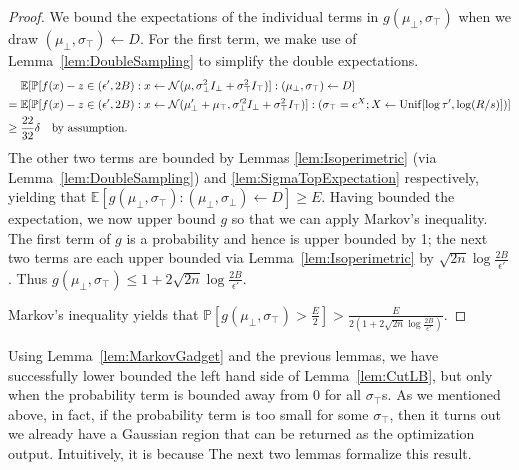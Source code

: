 \documentclass[11pt,letter]{article}
\renewcommand{\Pr}{\mathbb{P}}
\newcommand{\Exp}{\mathbb{E}}
\newcommand{\from}{\leftarrow}
\newcommand{\Normal}{\mathcal{N}}
\newcommand{\Unif}{\mathrm{Unif}}
\newcommand{\perr}{\delta}
\newcommand{\safety}{s}
\numberwithin{nTheorems}{section}
\begin{document}
\begin{proof}
We bound the expectations of the individual terms in $g(\mu_\bot,\sigma_\top)$ when we draw $(\mu_\bot,\sigma_\top)\from D$.
For the first term, we make use of Lemma~\ref{lem:DoubleSampling} to simplify the double expectations.
\begin{align*}
&\Exp[\Pr[f(x)-z \in (\epsilon',2B) : x \from \Normal(\mu, \sigma_\bot^2 I_\bot+\sigma_\top^2 I_\top)] : (\mu_\bot, \sigma_\top) \from D]\\
=\;&\Exp[\Pr[f(x)-z \in (\epsilon',2B) : x \from \Normal(\mu_\bot' + \mu_\top, \sigma_\bot'^2 I_\bot + \sigma_\top^2 I_\top)] : (\sigma_\top = e^X; X \from \Unif[\log \tau', \log (R/\safety)])]\\
\ge\;& \frac{22}{32}\perr \text{\quad by assumption.}
\end{align*}
The other two terms are bounded by Lemmas \ref{lem:Isoperimetric} (via Lemma~\ref{lem:DoubleSampling}) and \ref{lem:SigmaTopExpectation} respectively, yielding that $\Exp[g(\mu_\bot, \sigma_\top):(\mu_\bot, \sigma_\bot) \from D]\ge E$. Having bounded the expectation, we now upper bound $g$ so that we can apply Markov's inequality. The first term of $g$ is a probability and hence is upper bounded by 1; the next two terms are each upper bounded via Lemma~\ref{lem:Isoperimetric} by $\sqrt{2n}\log\frac{2B}{\epsilon'}$. Thus $g(\mu_\bot, \sigma_\top)\leq 1+2\sqrt{2n}\log\frac{2B}{\epsilon'}$.

Markov's inequality yields that $\Pr[g(\mu_\bot, \sigma_\top)>\frac{E}{2}]>\frac{E}{2(1+2\sqrt{2n}\log\frac{2B}{\epsilon'})}$.
\end{proof}

Using Lemma~\ref{lem:MarkovGadget} and the previous lemmas, we have successfully lower bounded the left hand side of Lemma~\ref{lem:CutLB}, but only when the probability term is bounded away from 0 for all $\sigma_\top$s.
As we mentioned above, in fact, if the probability term is too small for some $\sigma_\top$, then it turns out we already have a Gaussian region that can be returned as the optimization output.
Intuitively, it is because
The next two lemmas formalize this result.
\end{document}
